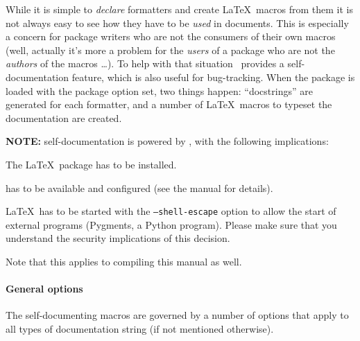 \documentclass[12pt]{scrartcl}
\begin{document}
While it is simple to \emph{declare} formatters and create \LaTeX\ macros from
them it is not always easy to see how they have to be \emph{used} in documents.
This is especially a concern for package writers who are not the consumers of
their own macros (well, actually it's more a problem for the \emph{users} of a
package who are not the \emph{authors} of the macros \dots).  To help with that
situation \luatemplates\ provides a self-documentation feature, which is
also useful for bug-tracking. When the package is loaded with the
 package option set, two things happen: “docstrings”
are generated for each formatter, and a number of \LaTeX\ macros to typeset the
documentation are created.

\medskip

\noindent \textbf{NOTE:} self-documentation is powered by , with
the following implications:

\begin{itemize*}
\item The  \LaTeX\ package has to be installed.
\item {} has to be available and configured (see the  manual for details).
\item \LaTeX\ has to be started with the \texttt{--shell-escape} option to
allow the start of external programs (Pygments, a Python program).  Please make
sure that you understand the security implications of this decision.
\item Note that this applies to compiling this manual as well.
\end{itemize*}

\paragraph{General options}

The self-documenting macros are governed by a number of options that apply to
all types of documentation string (if not mentioned otherwise).
\end{document}
